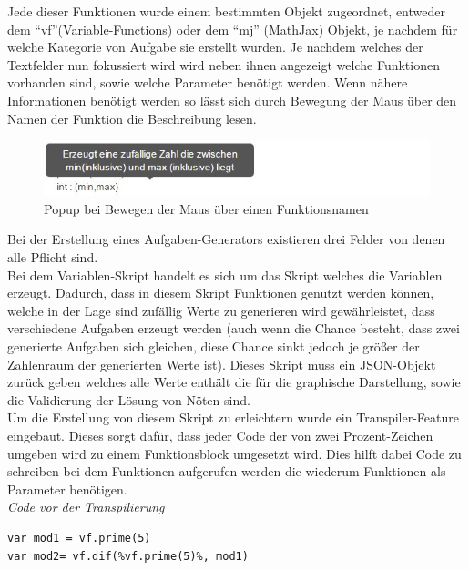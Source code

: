 Jede dieser Funktionen wurde einem bestimmten Objekt zugeordnet, entweder dem ``vf''(Variable-Functions) oder dem ``mj'' (MathJax) Objekt, je nachdem für welche Kategorie von Aufgabe sie erstellt wurden. Je nachdem welches der Textfelder nun fokussiert wird wird  neben ihnen angezeigt welche Funktionen vorhanden sind, sowie welche Parameter benötigt werden. Wenn nähere Informationen benötigt werden so lässt sich durch Bewegung der Maus über den Namen der Funktion die Beschreibung lesen.\\

\begin{figure}[htp]     %
\centering
\includegraphics[width=1\textwidth]{bilder/MouseOver} 
\caption[Popup bei Bewegen der Maus über einen Funktionsnamen]{Popup bei Bewegen der Maus über einen Funktionsnamen}
\end{figure} 

Bei der Erstellung eines Aufgaben-Generators existieren drei Felder von denen alle Pflicht sind. \\

Bei dem Variablen-Skript handelt es sich um das Skript welches die Variablen erzeugt. Dadurch, dass in diesem Skript Funktionen genutzt werden können, welche in der Lage sind zufällig Werte zu generieren wird gewährleistet, dass verschiedene Aufgaben erzeugt werden (auch wenn die Chance besteht, dass zwei generierte Aufgaben sich gleichen, diese Chance sinkt jedoch je größer der Zahlenraum der generierten Werte ist). Dieses Skript muss ein JSON-Objekt zurück geben welches alle Werte enthält die für die graphische Darstellung, sowie die Validierung der Lösung von Nöten sind. \\
Um die Erstellung von diesem Skript zu erleichtern wurde ein Transpiler-Feature eingebaut. Dieses sorgt dafür, dass jeder Code der von zwei Prozent-Zeichen umgeben wird zu einem Funktionsblock umgesetzt wird. Dies hilft dabei Code zu schreiben bei dem Funktionen aufgerufen werden die wiederum Funktionen als Parameter benötigen.\\


\emph{Code vor der Transpilierung}
\begin{lstlisting}
var mod1 = vf.prime(5)
var mod2= vf.dif(%vf.prime(5)%, mod1)
\end{lstlisting}

